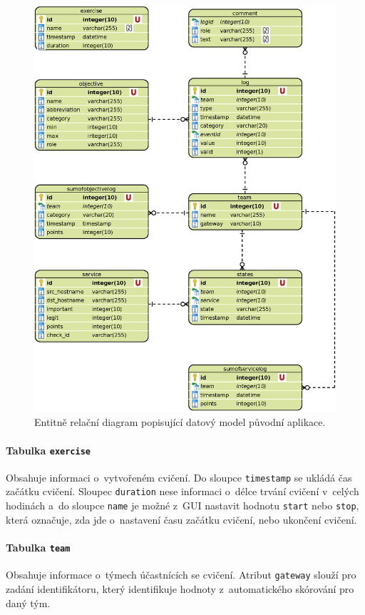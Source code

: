 \documentclass[
  digital,
  twoside,
  table, 
  nolof, 
  nolot
]{fithesis3}
\begin{document}
\begin{figure}[h!]
    \centering
    \includegraphics[width=13.5cm]{images/ERD-old-app.eps}
    \caption{Entitně relační diagram popisující datový model původní aplikace.}
    \label{fig:erdOldApp}
\end{figure}

\paragraph{Tabulka \texttt{exercise}} Obsahuje informaci o~vytvořeném cvičení. Do sloupce \texttt{timestamp} se ukládá čas začátku cvičení. Sloupec \texttt{duration} nese informaci o~délce trvání cvičení v~celých hodinách a~do sloupce \texttt{name} je možné z~GUI nastavit hodnotu \texttt{start} nebo \texttt{stop}, která označuje, zda jde o~nastavení času začátku cvičení, nebo ukončení cvičení.

\paragraph{Tabulka \texttt{team}} Obsahuje informace o~týmech účastnících se cvičení. Atribut \texttt{gateway} slouží pro zadání identifikátoru, který identifikuje hodnoty z~automatického skórování pro daný tým.
\end{document}
